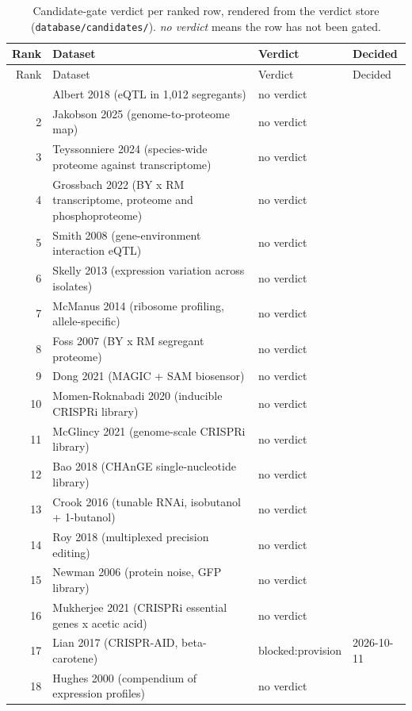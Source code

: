 \begingroup
\footnotesize
\begin{longtable}{@{}r L{88mm} L{40mm} L{24mm}@{}}
\caption[]{Candidate-gate verdict per ranked row, rendered from the verdict store
(\texttt{database/candidates/}). \emph{no verdict} means the row has not been gated.}
\label{tab:verdicts}\\
\toprule
Rank & Dataset & Verdict & Decided \\
\midrule
\endfirsthead
\toprule
Rank & Dataset & Verdict & Decided \\
\midrule
\endhead
\bottomrule
{} & Albert 2018 (eQTL in 1,012 segregants) & no verdict &  \\
2 & Jakobson 2025 (genome-to-proteome map) & no verdict &  \\
3 & Teyssonniere 2024 (species-wide proteome against transcriptome) & no verdict &  \\
4 & Grossbach 2022 (BY x RM transcriptome, proteome and phosphoproteome) & no verdict &  \\
5 & Smith 2008 (gene-environment interaction eQTL) & no verdict &  \\
6 & Skelly 2013 (expression variation across isolates) & no verdict &  \\
7 & McManus 2014 (ribosome profiling, allele-specific) & no verdict &  \\
8 & Foss 2007 (BY x RM segregant proteome) & no verdict &  \\
9 & Dong 2021 (MAGIC + SAM biosensor) & no verdict &  \\
10 & Momen-Roknabadi 2020 (inducible CRISPRi library) & no verdict &  \\
11 & McGlincy 2021 (genome-scale CRISPRi library) & no verdict &  \\
12 & Bao 2018 (CHAnGE single-nucleotide library) & no verdict &  \\
13 & Crook 2016 (tunable RNAi, isobutanol + 1-butanol) & no verdict &  \\
14 & Roy 2018 (multiplexed precision editing) & no verdict &  \\
15 & Newman 2006 (protein noise, GFP library) & no verdict &  \\
16 & Mukherjee 2021 (CRISPRi essential genes x acetic acid) & no verdict &  \\
17 & Lian 2017 (CRISPR-AID, beta-carotene) & blocked:provision & 2026-10-11 \\
18 & Hughes 2000 (compendium of expression profiles) & no verdict &  \\

\end{longtable}
